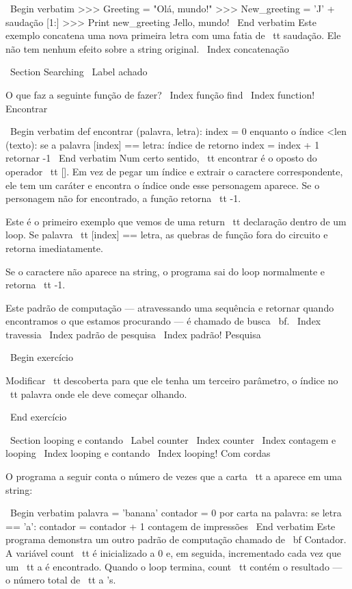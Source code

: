 \documentclass[10pt]{book}
\begin{document}
\begin {itemize}
{{{{{\ Begin {verbatim}
>>> Greeting = "Olá, mundo!"
>>> New_greeting = 'J' + saudação [1:]
>>> Print new_greeting
Jello, mundo!
\ End {verbatim}
%
Este exemplo concatena uma nova primeira letra com
uma fatia de {\ tt saudação}. Ele não tem nenhum efeito sobre
a string original.
\ Index {concatenação}


\ Section {} Searching
\ Label {achado}

O que faz a seguinte função de fazer?
\ Index {função find}
\ Index {function! Encontrar}

\ Begin {verbatim}
def encontrar (palavra, letra):
    index = 0
    enquanto o índice <len (texto):
        se a palavra [index] == letra:
            índice de retorno
        index = index + 1
    retornar -1
\ End {verbatim}
%
Num certo sentido, {\ tt encontrar} é o oposto do operador {\ tt []}.
Em vez de pegar um índice e extrair o caractere correspondente,
ele tem um caráter e encontra o índice onde esse personagem
aparece. Se o personagem não for encontrado, a função retorna {\ tt
-1}.

Este é o primeiro exemplo que vemos de uma {return \ tt} declaração
dentro de um loop. Se {palavra \ tt [index] == letra}, as quebras de função
fora do circuito e retorna imediatamente.

Se o caractere não aparece na string, o programa
sai do loop normalmente e retorna {\ tt -1}.

Este padrão de computação --- atravessando uma sequência e retornar
quando encontramos o que estamos procurando --- é chamado de busca {\ bf}.
\ Index {travessia}
\ Index {padrão de pesquisa}
\ Index {padrão! Pesquisa}

\ Begin {} exercício

Modificar {\ tt descoberta} para que ele tenha um
terceiro parâmetro, o índice no {\ tt palavra} onde ele deve começar
olhando.

\ End {} exercício


\ Section {looping e contando}
\ Label {counter}
\ Index {counter}
\ Index {contagem e looping}
\ Index {looping e contando}
\ Index {looping! Com cordas}

O programa a seguir conta o número de vezes que a carta {\ tt a}
aparece em uma string:

\ Begin {verbatim}
palavra = 'banana'
contador = 0
por carta na palavra:
    se letra == 'a':
        contador = contador + 1
contagem de impressões
\ End {verbatim}
%
Este programa demonstra um outro padrão de computação chamado de {\ bf
Contador}. A variável {count \ tt} é inicializado a 0 e, em seguida,
incrementado cada vez que um {\ tt a} é encontrado.
Quando o loop termina, {count \ tt}
contém o resultado --- o número total de {\ tt a} 's.

}}}}}
\end{itemize}
\end{document}
